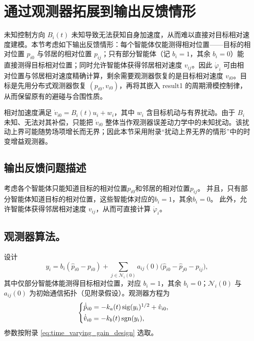 \section{通过观测器拓展到输出反馈情形}

未知控制方向 $B_i(t)$ 未知导致无法获知自身加速度，从而难以直接对目标相对速度建模。本节考虑如下输出反馈情形：每个智能体仅能测得相对位置——目标的相对位置 $p_{i0}$ 与邻居的相对位置 $p_{ij}$；只有部分智能体（记 $b_i=1$，其余 $b_i=0$）能直接测得目标相对位置；同时允许智能体获得邻居相对速度 $v_{ij}$。因此 $\dot\varphi_i$ 可由相对位置与邻居相对速度精确计算，剩余需要观测器恢复的是目标相对速度 $v_{i0}$。目标是先用分布式观测器恢复 $(p_{i0},v_{i0})$，再将其嵌入 result1 的周期滑模控制律，从而保留原有的避碰与合围性质。

相对加速度满足 $\dot v_{i0}=B_i(t)u_i+w_i$，其中 $w_i$ 含目标机动与有界扰动。由于 $B_i$ 未知、无法对其补偿，只能把 $\dot v_{i0}$ 整体当作观测器误差动力学中的未知扰动。该扰动上界可能随势场项增长而无界；因此本节采用附录“扰动上界无界的情形”中的时变增益观测器。

\subsection{输出反馈问题描述}

考虑各个智能体只能知道目标的相对位置$p_{i0}$和邻居的相对位置$p_{ij}$。
并且，只有部分智能体知道目标的相对位置，这些智能体对应的$b_i=1$，其余$b_i=0$。
此外，允许智能体获得邻居相对速度 $v_{ij}$，从而可直接计算 $\dot\varphi_i$。

\subsection{观测器算法。}
设计
\[
    y_i=b_i(\hat{p}_{i0}-p_{i0})+\sum_{j\in\mathcal{N}_i(0)}a_{ij}(0)\bigl(\hat{p}_{i0}-\hat{p}_{j0}-p_{ij}\bigr),
\]
其中仅部分智能体能测得目标相对位置，对应 $b_i=1$，其余 $b_i=0$；$\mathcal N_i(0)$ 与 $a_{ij}(0)$ 为初始通信拓扑（见附录假设）。观测器方程为
\begin{equation}
    \begin{cases}
        \dot{\hat{p}}_{i0}=-k_a(t) \operatorname{sig}(y_i)^{1/2} + \hat{v}_{i0},\\[2pt]
        \dot{\hat{v}}_{i0}=-k_b(t) \operatorname{sgn}(y_i),
    \end{cases}
    \label{eq observer}
\end{equation}
参数按附录 \eqref{eq:time_varying_gain_design} 选取。

